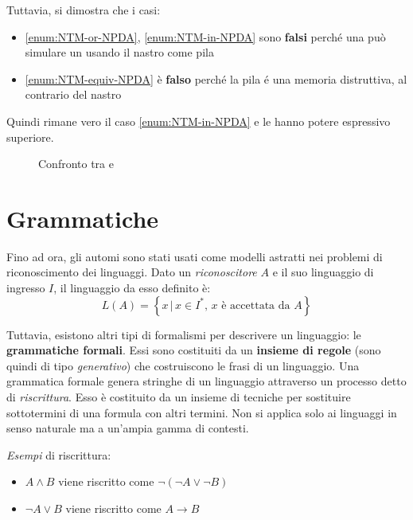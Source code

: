 \documentclass[italian, 10pt]{article}
\begin{document}
Tuttavia, si dimostra che i casi:

\begin{itemize}
  \item \ref{enum:NTM-or-NPDA}, \ref{enum:NTM-in-NPDA} sono \textbf{falsi} perché una \NTM può simulare un \NPDA usando il nastro come pila
  \item \ref{enum:NTM-equiv-NPDA} è \textbf{falso} perché la pila \'e una memoria distruttiva, al contrario del nastro
\end{itemize}

Quindi rimane vero il caso \ref{enum:NTM-in-NPDA} e le \NTM hanno potere espressivo superiore.

\begin{figure}[htbp]
  \bigskip
  \centering
  \caption{Confronto tra \NPDA e \NTM}
  \label{fig:confronto-NPDA-NTM}
  \bigskip
\end{figure}

\clearpage

\section{Grammatiche}
\label{sec:grammatiche}

Fino ad ora, gli automi sono stati usati come modelli astratti nei problemi di riconoscimento dei linguaggi.
Dato un \textit{riconoscitore} \(A\) e il suo linguaggio di ingresso \(I\), il linguaggio da esso definito è:
\[ L(A) = \left\{x \, | \, x \in I^\ast, \, x \text{ è accettata da } A \right\} \]

Tuttavia, esistono altri tipi di formalismi per descrivere un linguaggio: le \textbf{grammatiche formali}.
Essi sono costituiti da un \textbf{insieme di regole} (sono quindi di tipo \textit{generativo}) che costruiscono le frasi di un linguaggio.
Una grammatica formale genera stringhe di un linguaggio attraverso un processo detto di \textit{riscrittura}.
Esso è costituito da un insieme di tecniche per sostituire sottotermini di una formula con altri termini.
Non si applica solo ai linguaggi in senso naturale ma a un'ampia gamma di contesti.

\bigskip
\textit{Esempi} di riscrittura:

\begin{itemize}
  \item \(A \land B\) viene riscritto come \(\lnot (\lnot A \lor \lnot B)\)
  \item \(\lnot A \lor B\) viene riscritto come \(A \rightarrow B\)
\end{itemize}
\end{document}
